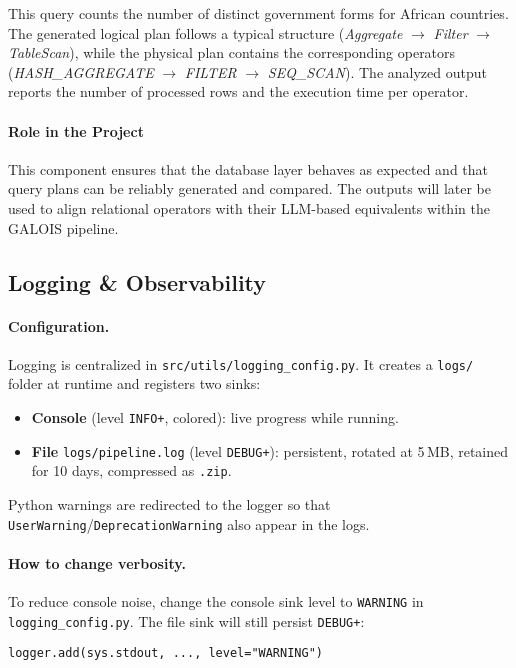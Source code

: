 \documentclass[12pt,a4paper]{article}
\begin{document}
This query counts the number of distinct government forms for African countries.
The generated logical plan follows a typical structure
(\emph{Aggregate} $\rightarrow$ \emph{Filter} $\rightarrow$ \emph{TableScan}),
while the physical plan contains the corresponding operators
(\emph{HASH\_AGGREGATE} $\rightarrow$ \emph{FILTER} $\rightarrow$
\emph{SEQ\_SCAN}). The analyzed output reports the number of processed rows and
the execution time per operator.

\paragraph{Role in the Project}
This component ensures that the database layer behaves as expected and that
query plans can be reliably generated and compared. The outputs will later be
used to align relational operators with their LLM-based equivalents within the
GALOIS pipeline.

\subsection{Logging \& Observability}
\label{subsec:logging-impl}

\paragraph{Configuration.}
Logging is centralized in \texttt{src/utils/logging\_config.py}. It creates a \texttt{logs/} folder at runtime and registers two sinks:
\begin{itemize}
  \item \textbf{Console} (level \texttt{INFO+}, colored): live progress while running.
  \item \textbf{File} \texttt{logs/pipeline.log} (level \texttt{DEBUG+}): persistent, rotated at 5\,MB, retained for 10 days, compressed as \texttt{.zip}.
\end{itemize}
Python warnings are redirected to the logger so that \texttt{UserWarning}/\texttt{DeprecationWarning} also appear in the logs.

\paragraph{How to change verbosity.}
To reduce console noise, change the console sink level to \texttt{WARNING} in
\texttt{logging\_config.py}. The file sink will still persist \texttt{DEBUG+}:
\begin{verbatim}
logger.add(sys.stdout, ..., level="WARNING")
\end{verbatim}
\end{document}
